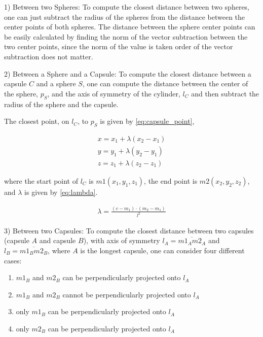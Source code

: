 \documentclass[a4paper, 10pt, conference]{ieeeconf}      %
\begin{document}
1) Between two Spheres: 
To compute the closest distance between two spheres, one can just subtract the radius of the spheres from the distance between the center points of both spheres. The distance between the sphere center points can be easily calculated by finding the norm of the vector subtraction between the two center points, since the norm of the value is taken order of the vector subtraction does not matter.

2) Between a Sphere and a Capsule:
To compute the closest distance between a capsule $C$ and a sphere $S$, one can compute the distance between the center of the sphere, $p_S$, and the axis of symmetry of the cylinder, $l_C$
and then subtract the radius of the sphere and the capsule. 

The closest point, on $l_C$, to $p_S$ is given by \eqref{eq:capsule_point},

\begin{equation}       
    \begin{matrix} 
        x = x_1 + \lambda(x_2 - x_1) \\
        y = y_1 + \lambda(y_2 - y_1) \\
        z = z_1 + \lambda(z_2 - z_1) \label{eq:capsule_point}
    \end{matrix}
\end{equation}

where the start point of $l_C$ is $m1(x_1, y_1, z_1)$, the end point is $m2(x_2, y_2, z_2)$, and $\lambda$ is given by \eqref{eq:lambda}.

\begin{equation}       
    \begin{matrix} 
        \lambda = \frac{(c - m_1) \cdot (m_2 - m_1 )}{l^2} \label{eq:lambda}
    \end{matrix}
\end{equation}

3) Between two Capsules:
To compute the closest distance between two capsules (capsule $A$ and capsule $B$), with axis of symmetry $l_A = \overline{m1_A m2_A}$ and $l_B = \overline{m1_B m2_B}$, 
where $A$ is the longest capsule, one can consider four different cases:
\begin{enumerate}
    \item $m1_B$ and $m2_B$ can be perpendicularly projected onto $l_A$
    \item $m1_B$ and $m2_B$ cannot be perpendicularly projected onto $l_A$
    \item only $m1_B$ can be perpendicularly projected onto $l_A$
    \item only $m2_B$ can be perpendicularly projected onto $l_A$
\end{enumerate} 
\end{document}

